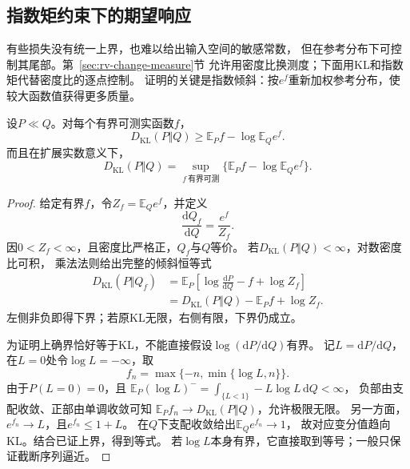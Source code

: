 \subsection{指数矩约束下的期望响应}
\label{sec:information-change-measure}

有些损失没有统一上界，也难以给出输入空间的敏感常数，
但在参考分布下可控制其尾部。第~\ref{sec:rv-change-measure}节
允许用密度比换测度；下面用KL和指数矩代替密度比的逐点控制。
证明的关键是指数倾斜：按\(e^f\)重新加权参考分布，使较大函数值获得更多质量。

\begin{theorem}
\label{thm:information-donsker-varadhan}
设\(P\ll Q\)。对每个有界可测实函数\(f\)，
\begin{equation}
  D_{\mathrm{KL}}(P\Vert Q)
  \geq\mathbb E_Pf-\log\mathbb E_Qe^f.
  \label{eq:information-dv-lower}
\end{equation}
而且在扩展实数意义下，
\begin{equation}
  D_{\mathrm{KL}}(P\Vert Q)
  =\sup_{f\ \text{有界可测}}\{\mathbb E_Pf-\log\mathbb E_Qe^f\}.
  \label{eq:information-dv-variational}
\end{equation}
\end{theorem}
\begin{proof}
给定有界\(f\)，令\(Z_f=\mathbb E_Qe^f\)，并定义
\[
  \frac{\mathrm dQ_f}{\mathrm dQ}=\frac{e^f}{Z_f}.
\]
因\(0<Z_f<\infty\)，且密度比严格正，\(Q_f\)与\(Q\)等价。
若\(D_{\mathrm{KL}}(P\Vert Q)<\infty\)，对数密度比可积，
乘法法则给出完整的倾斜恒等式
\[
\begin{aligned}
  D_{\mathrm{KL}}(P\Vert Q_f)
  &=\mathbb E_P\left[\log\frac{\mathrm dP}{\mathrm dQ}-f+\log Z_f\right]\\
  &=D_{\mathrm{KL}}(P\Vert Q)-\mathbb E_Pf+\log Z_f.
\end{aligned}
\]
左侧非负即得下界；若原KL无限，右侧有限，下界仍成立。

为证明上确界恰好等于KL，不能直接假设\(\log(\mathrm dP/\mathrm dQ)\)有界。
记\(L=\mathrm dP/\mathrm dQ\)，在\(L=0\)处令\(\log L=-\infty\)，取
\[
  f_n=\max\{-n,\min\{\log L,n\}\}.
\]
由于\(P(L=0)=0\)，且
\(\mathbb E_P(\log L)^-=\int_{\{L<1\}}-L\log L\,\mathrm dQ<\infty\)，
负部由支配收敛、正部由单调收敛可知
\(\mathbb E_Pf_n\to D_{\mathrm{KL}}(P\Vert Q)\)，允许极限无限。
另一方面，\(e^{f_n}\to L\)，且\(e^{f_n}\leq1+L\)。
在\(Q\)下支配收敛给出\(\mathbb E_Qe^{f_n}\to1\)，
故对应变分值趋向KL。结合已证上界，得到等式。
若\(\log L\)本身有界，它直接取到等号；一般只保证截断序列逼近。
\end{proof}


